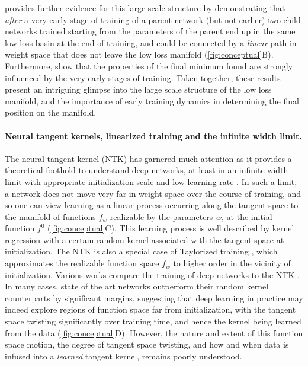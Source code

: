 \documentclass{article}
\begin{document}
\cite{frankle2019linear} provides further evidence for this large-scale structure by demonstrating that {\it after} a very early stage of training of a parent network (but not earlier) two child networks trained starting from the parameters of the parent end up in the same low loss basin at the end of training, and could be connected by a {\it linear} path in weight space that does not leave the low loss manifold (\cref{fig:conceptual}B).  
Furthermore, \cite{jastrzebski2020breakeven,leclerc2020two} show that the properties of the final minimum found are strongly influenced by the very early stages of training.  
Taken together, these results present an intriguing glimpse into the large scale structure of the low loss manifold, and the importance of early training dynamics in determining the final position on the manifold.

\vspace{-0.3cm}
\paragraph{Neural tangent kernels, linearized training and the infinite width limit.} The neural tangent kernel (NTK) has garnered much attention as it provides a theoretical foothold to understand deep networks, at least in an infinite width limit with appropriate initialization scale and low learning rate \cite{jacot2018neural,novak2019neural}.  
In such a limit, a network does not move very far in weight space over the course of training, and so one can view learning as a linear process occurring along the tangent space to the manifold of functions $f_w$ realizable by the parameters $w$, at the initial function $f^0$ (\cref{fig:conceptual}C). 
This learning process is well described by kernel regression with a certain random kernel associated with the tangent space at initialization. 
The NTK is also a special case of Taylorized training \cite{bai2020taylorized}, which approximates the realizable function space $f_w$ to higher order in the vicinity of initialization. 
Various works compare the training of deep networks to the NTK \cite{arora2019exact,lee2019wide,arora2019harnessing,shankar2020neural}. 
In many cases, state of the art networks outperform their random kernel counterparts by significant margins, suggesting that deep learning in practice may indeed explore regions of function space far from initialization, with the tangent space twisting significantly over training time, and hence the kernel being learned from the data (\cref{fig:conceptual}D). However, the nature and extent of this function space motion, the degree of tangent space twisting, and how and when data is infused into a {\it learned} tangent kernel, remains poorly understood.  
 
\end{document}
